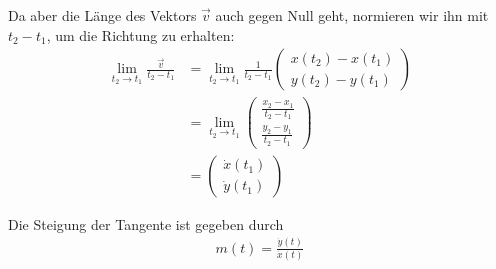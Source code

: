 \documentclass[12pt]{article}
\newenvironment{definition}[2][Definition]{\begin{trivlist}
        \item[\hskip \labelsep {\bfseries #1}\hskip \labelsep {\bfseries #2.}]}{\flushright{$\square$}\end{trivlist}}
\begin{document}
\begin{definition}{[Tangenten]}
    Da aber die Länge des Vektors $\vec{v}$ auch gegen Null geht, normieren wir ihn mit $t_2-t_1$, um die Richtung zu erhalten:
    \begin{align*}
        \lim_{t_2\to t_1} \frac{\vec{v}}{t_2-t_1} & = \lim_{t_2\to t_1}\frac{1}{t_2-t_1} \begin{pmatrix}
                                                                                             x(t_2) - x(t_1) \\
                                                                                             y(t_2) - y(t_1)
                                                                                         \end{pmatrix} \\
                                                  & =\lim_{t_2\to t_1} \begin{pmatrix}
                                                                           \frac{x_2-x_1}{t_2-t_1} \\
                                                                           \frac{y_2-y_1}{t_2-t_1}
                                                                       \end{pmatrix}           \\
                                                  & =\begin{pmatrix}
                                                         \dot{x}(t_1) \\
                                                         \dot{y}(t_1)
                                                     \end{pmatrix}
    \end{align*}

    Die Steigung der Tangente ist gegeben durch
    \begin{align*}
        m(t)=\frac{\dot{y}(t)}{\dot{x}(t)}
    \end{align*}
\end{definition}
\end{document}
